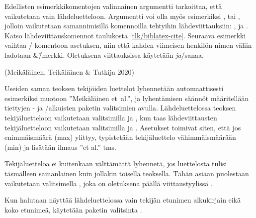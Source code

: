Edellisten esimerkkikomentojen valinnainen argumentti 
tarkoittaa, että vaikutetaan vain lähdeluetteloon. Argumentti voi olla
myös esimerkiksi ,  tai ,
jolloin vaikutetaan samannimisillä komennoilla tehtyihin
lähdeviittauksiin: ,  ja
. Katso lähdeviittauskomennot taulukosta
\ref{tlk/biblatex-cite}. Seuraava esimerkki vaihtaa
\-/ komentoon asetuksen, niin että kahden viimeisen
henkilön nimen väliin ladotaan \&\=/merkki. Oletuksena viittauksissa
käytetään \textit{ja}\-/sanaa.

\begin{koodilohkosis}
\end{koodilohkosis}

\begin{tulossis}
  (Meikäläinen, Teikäläinen \& Tutkija 2020)
\end{tulossis}

\noindent
Useiden saman teoksen tekijöiden luettelot lyhennetään automaattisesti
esimerkiksi muotoon ''Meikäläinen et~al.'', ja lyhentämisen säännöt
määritellään tiettyjen - ja \-/alkuisten paketin
valitsimien avulla. Lähdeluettelossa teoksen tekijäluetteloon
vaikutetaan valitsimilla  ja
, kun taas lähdeviittausten tekijäluetteloon
vaikutetaan valitsimilla  ja
. Asetukset toimivat siten, että jos
enimmäismäärä (max) ylittyy, typistetään tekijäluettelo vähimmäismäärään
(min) ja lisätään ilmaus ''et al.'' tms.

Tekijäluetteloa ei kuitenkaan välttämättä lyhennetä, jos luettelosta
tulisi täsmälleen samanlainen kuin jollakin toisella teoksella. Tähän
asiaan puolestaan vaikutetaan valitsimella , joka on
oletuksena päällä viittaustyylissä .

\begin{koodilohkosis}
\usepackage[style=authoryear, maxbibnames=99, minbibnames=3,
  maxcitenames=3, mincitenames=1, uniquelist=true]{biblatex}
\end{koodilohkosis}

\noindent
Kun halutaan näyttää lähdeluettelossa vain tekijän etunimen alkukirjain
eikä koko etunimeä, käytetään paketin valitsinta .

